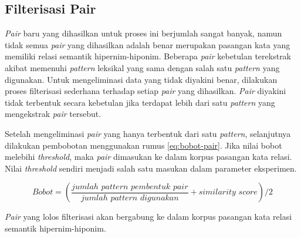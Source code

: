 \subsection{Filterisasi Pair}
\textit{Pair} baru yang dihasilkan untuk proses ini berjumlah sangat banyak, namun tidak semua \textit{pair} yang dihasilkan adalah benar merupakan pasangan kata yang memiliki relasi semantik hipernim-hiponim. Beberapa \textit{pair} kebetulan terekstrak akibat memenuhi \textit{pattern} leksikal yang sama dengan salah satu \textit{pattern} yang digunakan. Untuk mengeliminasi data yang tidak diyakini benar, dilakukan proses filterisasi sederhana terhadap setiap \textit{pair} yang dihasilkan. \textit{Pair} diyakini tidak terbentuk secara kebetulan jika terdapat lebih dari satu \textit{pattern} yang mengekstrak \textit{pair} tersebut. 

Setelah mengeliminasi \textit{pair} yang hanya terbentuk dari satu \textit{pattern}, selanjutnya dilakukan pembobotan menggunakan rumus \ref{eq:bobot-pair}. Jika nilai bobot melebihi \textit{threshold}, maka \textit{pair} dimasukan ke dalam korpus pasangan kata relasi. Nilai \textit{threshold} sendiri menjadi salah satu masukan dalam parameter eksperimen.

\begin{equation}
\label{eq:bobot-pair}
Bobot = (\frac{jumlah\,\,pattern\,\,pembentuk\,\,pair}{jumlah\,\,pattern\,\,digunakan} + similarity\,\,score)/2
\end{equation}

\noindent \textit{Pair} yang lolos filterisasi akan bergabung ke dalam korpus pasangan kata relasi semantik hipernim-hiponim.
%

%
